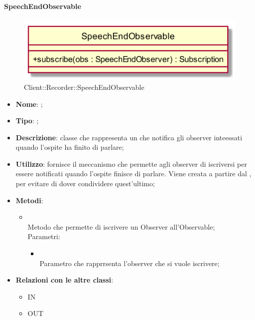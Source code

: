 \hypertarget{SpeechEndObservable_label}{\paragraph{SpeechEndObservable}}
\begin{figure}[h]
	\centering
	\includegraphics[width=\textwidth,height=\textheight,keepaspectratio]{images/ClassSpeechEndObservable.png}
	\caption{Client::Recorder::SpeechEndObservable}
\end{figure}
\begin{itemize}
	\item \textbf{Nome}: ;
	\item \textbf{Tipo}: ;
	\item \textbf{Descrizione}: classe che rappresenta un  che notifica gli observer inteessati quando l'ospite ha finito di parlare;
	\item \textbf{Utilizzo}: fornisce il meccanismo che permette agli observer di iscriversi per essere notificati quando l'ospite finisce di parlare. Viene creata a partire dal , per evitare di dover condividere quest'ultimo;
	\item \textbf{Metodi}:
	\begin{itemize}
		\item[]  \\
		Metodo che permette di iscrivere un Observer all'Observable;\\
		Parametri:
		\begin{itemize}
			\item {} \\
			Parametro che rapprrsenta l'observer che si vuole iscrivere;
		\end{itemize}
	\end{itemize}
	\item \textbf{Relazioni con le altre classi}:
	\begin{itemize}
		\item IN \hyperlink{LogicObserver_label}{}
		\item OUT \hyperlink{SpeechEndSubject_label}{}
	\end{itemize}
\end{itemize}

